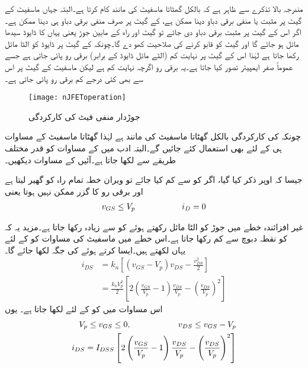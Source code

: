 مندرجہ بالا تذکرے سے ظاہر ہے کہ  بالکل گھٹاتا ماسفیٹ کی مانند کام کرتا ہے۔البتہ جہاں ماسفیٹ کے گیٹ پر مثبت یا منفی برقی دباو دینا ممکن ہے،  کے گیٹ پر صرف منفی برقی دباو ہی دینا ممکن ہے۔اگر اس کے گیٹ پر مثبت برقی دباو دی جائے تو گیٹ اور راہ کے مابین  جوڑ یعنی یہاں کا ڈایوڈ سیدھا مائل ہو جائے گا اور گیٹ  کو قابو کرنے کی صلاحیت کھو دے گا۔چونکہ  کے گیٹ پر ڈایوڈ کو الٹا مائل رکھا جاتا ہے لہٰذا اس کے گیٹ پر نہایت کم (الٹے مائل ڈایوڈ کے برابر) برقی رو پائی جاتی ہے جسے عموماً صفر ایمپیئر تصور کیا جاتا ہے۔یہ برقی رو اگرچہ نہایت کم ہے لیکن ماسفیٹ کے گیٹ پر اس سے بھی کئی درجے کم برقی رو پائی جاتی ہے۔
\begin{figure}
\centering
\texttt{[image: nJFEToperation]}
\caption{جوڑدار منفی فیٹ کی کارکردگی}
\label{شکل_جوڑدار_منفی_فیٹ_کارکردگی}
\end{figure}

چونکہ  کی کارکردگی بالکل گھٹاتا ماسفیٹ کی مانند ہے لہٰذا گھٹاتا ماسفیٹ کے مساوات ہی   کے لئے بھی  استعمال کئے جائیں گے۔البتہ  ادب میں  کے مساوات کو قدر مختلف طریقے سے لکھا جاتا ہے۔آئیں  کے مساوات دیکھیں۔

جیسا کہ اوپر ذکر کیا گیا، اگر  کو  سے کم کیا جائے تو ویران خطہ تمام راہ کو گھیر لیتا ہے اور برقی رو کا گزر ممکن نہیں ہوتا یعنی
\begin{align}
v_{GS} \le V_p   \hspace{2 cm}  i_D=0 
\end{align}

غیر افزائندہ خطے میں  جوڑ کو الٹا مائل رکھتے ہوئے  کو  سے زیادہ رکھا جاتا ہے۔مزید یہ کہ  کو نقطہ دبوچ سے کم رکھا جاتا ہے۔اس خطے میں ماسفیٹ کی مساوات  کو  کے لئے  یہاں لکھتے ہیں۔ایسا کرتے ہوئے  کی جگہ  لکھا جائے گا۔
 \begin{align*}
i_{DS} &=k_n \left[ (v_{GS}-V_p) v_{DS}-\frac{v_{DS}^2}{2} \right] \\
&=\frac{k_n V_p^2}{2} \left[ 2 \left(\frac{v_{GS}}{V_p}-1 \right)  \frac{v_{DS}}{V_p}-\left(\frac{v_{DS}}{V_p} \right)^2 \right]
\end{align*}
اس مساوات میں  کو  کے لئے  لکھا جاتا ہے۔ یوں
\begin{gather}
\begin{aligned} \label{مساوات_منفی_فیٹ_غیر_افزائندہ}
V_p \le v_{GS} \le 0, \hspace{2 cm} v_{DS} \le v_{GS}-V_p \\
i_{DS}=I_{DSS} \left[ 2 \left(\frac{v_{GS}}{V_p}-1 \right)  \frac{v_{DS}}{V_p}-\left(\frac{v_{DS}}{V_p} \right)^2 \right]
\end{aligned}
\end{gather}

